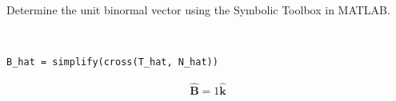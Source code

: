 Determine the unit binormal vector using the Symbolic Toolbox in MATLAB.

\begin{solution} \
\begin{lstlisting}
B_hat = simplify(cross(T_hat, N_hat))
\end{lstlisting}

\begin{align*}
    \boldsymbol{\hat{B}} = 1 \hat{\boldsymbol{k}}
\end{align*}
\end{solution}
